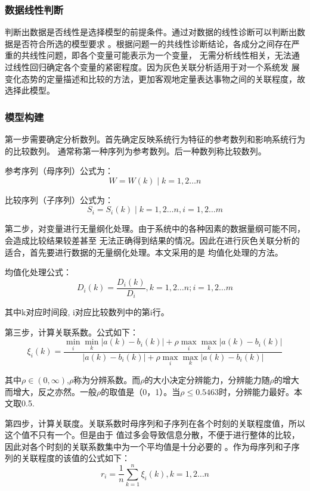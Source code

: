 \documentclass[UTF8]{ctexart}
\begin{document}
\subsubsection{数据线性判断}
判断出数据是否线性是选择模型的前提条件。通过对数据的线性诊断可以判断出数据是否符合所选的模型要求
。根据问题一的共线性诊断结论，各成分之间存在严重的共线性问题，即各个变量可能表示为一个变量，
无需分析线性相关，无法通过线性回归确定各个变量的紧密程度。因为灰色关联分析适用于对一个系统发
展变化态势的定量描述和比较的方法，更加客观地定量表达事物之间的关联程度，故选择此模型。

\subsubsection{模型构建}
第一步需要确定分析数列。首先确定反映系统行为特征的参考数列和影响系统行为的比较数列。
通常称第一种序列为参考数列。后一种数列称比较数列。

参考序列（母序列）公式为：
\begin{equation}
	W=W(k) \mid k=1,2\dots n
\end{equation}

比较序列（子序列）公式为：
\begin{equation}
	S_{i}=S_{i}(k) \mid k=1,2 \ldots n,i=1,2 \ldots m
\end{equation}

第二步，对变量进行无量纲化处理。由于系统中的各种因素的数据量纲可能不同，会造成比较结果较差甚至
无法正确得到结果的情况。因此在进行灰色关联分析的适合，首先要进行数据的无量纲化处理。本文采用的是
均值化处理的方法。

均值化处理公式：
\begin{equation}
	D_{i}(k)=\frac{D_{i}(k)}{D_{i}}, k=1,2 \ldots n;i=1,2 \ldots m
\end{equation}

其中k对应时间段, i对应比较数列中的第i行。

第三步，计算关联系数。公式如下：
\begin{equation}
	\xi_{i}(k)=\frac{\min _{i} \min _{k}\left|a(k)-b_{i}(k)\right|+\rho \max _{i} \max _{k}\left|a(k)-b_{i}(k)\right|}{\left|a(k)-b_{i}(k)\right|+\rho \max _{i} \max _{k}\left|a(k)-b_{i}(k)\right|}
\end{equation}

其中$\rho \in(0, \infty)$,$\rho$称为分辨系数。而$\rho$的大小决定分辨能力，分辨能力随$\rho$的增大
而增大，反之亦然。一般$\rho$的取值是（0，1）。当$\rho\mathbf{\le }0.5463$时，分辨能力最好。本文取0.5.

第四步，计算关联度。关联系数时母序列和子序列在各个时刻的关联程度值，所以这个值不只有一个。但是由于
值过多会导致信息分散，不便于进行整体的比较，因此对各个时刻的关联系数集中为一个平均值是十分必要的
。作为母序列和子序列的关联程度的该值的公式如下：
\begin{equation}
    r_{i}=\frac{1}{n} \sum_{k=1}^{n} \xi_{i}(k), k=1,2 \ldots n
\end{equation}
\end{document}
